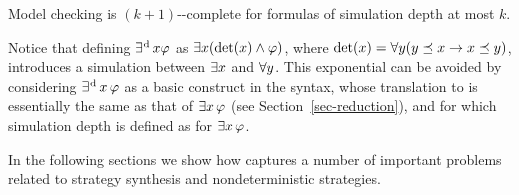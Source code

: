 \begin{theorem}
  \label{theo-SLref}
  Model checking \SLref is $(k+1)$-\EXPTIME-complete for formulas of
  simulation depth at most $k$.
\end{theorem}

\begin{remark}
  \label{rem-def-existsdet}
Notice that defining $\operatorname*{\exists^{\hskip.5pt\text{d}}} x\varphi$ as $\exists x
(\det(x)\wedge \varphi)$, where $\det(x)=\forall y (y
\preceq x \rightarrow x \preceq y)$, introduces a
simulation between $\exists x$ and $\forall y$. This
exponential can be avoided by considering $\operatorname*{\exists^{\hskip.5pt\text{d}}} x\,\varphi$ as a basic
construct in the syntax, whose translation to \QCTLs is essentially
the same as that of $\exists x\,\varphi$ (see
Section~\ref{sec-reduction}), and for which simulation depth is
defined as for $\exists x\,\varphi$.
\end{remark}

In the following sections we  show how \SLref captures a number of
important problems related to strategy synthesis and nondeterministic strategies. 






